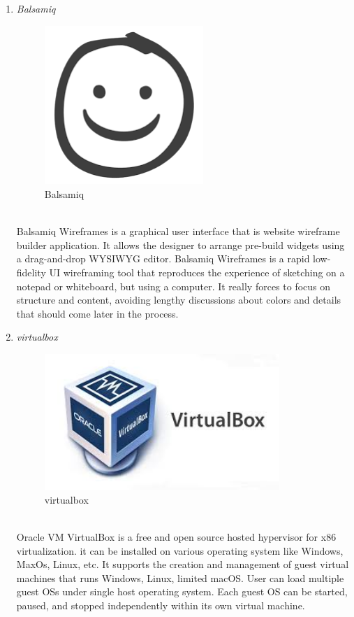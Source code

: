\documentclass[conference]{IEEEtran}
\begin{document}
\begin{enumerate}
  \vspace{30mm}

   \item \textit{Balsamiq }
                   \begin{figure}[htbp]
    \centerline{\includegraphics[width=60mm, scale=0.5]{fig/balsamiq.png}}
    \caption{Balsamiq }
    \label{fig}
    \end{figure}
   \\Balsamiq Wireframes is a graphical user interface that is website wireframe builder application. It allows the designer to arrange pre-build widgets using a drag-and-drop WYSIWYG editor. Balsamiq Wireframes is a rapid low-fidelity UI wireframing tool that reproduces the experience of sketching on a notepad or whiteboard, but using a computer. It really forces to focus on structure and content, avoiding lengthy discussions about colors and details that should come later in the process.\\
    \item \textit{virtualbox }
                    \begin{figure}[htbp]
    \centerline{\includegraphics[width=89mm, scale=0.5]{fig/virtual_box.jpg}}
    \caption{virtualbox}
    \label{fig}
    \end{figure}
   \\Oracle VM VirtualBox is a free and open source hosted hypervisor for x86 virtualization. it can be installed on various operating system like Windows, MaxOs, Linux, etc. It supports the creation and management of guest virtual machines that runs Windows, Linux, limited macOS. User can load multiple guest OSs under single host operating system. Each guest OS can be started, paused, and stopped independently within its own virtual machine.\\

\end{enumerate}
\end{document}
